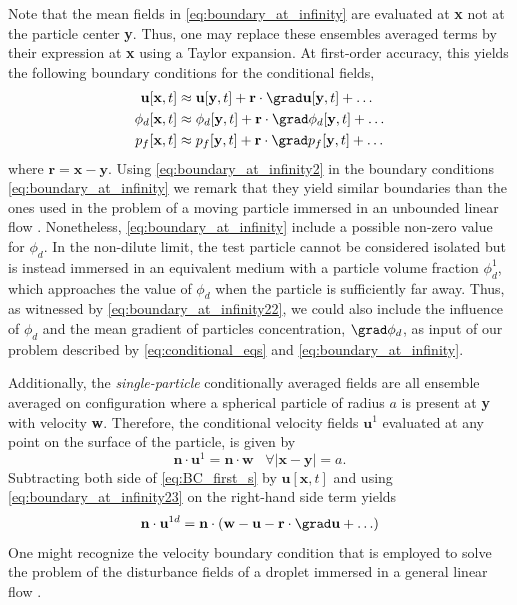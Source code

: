 Note that the mean fields in \ref{eq:boundary_at_infinity} are evaluated at \textbf{x} not at the particle center \textbf{y}.
Thus, one may replace these ensembles averaged terms by their expression at \textbf{x} using a Taylor expansion. 
At first-order accuracy, this yields the following boundary conditions for the conditional fields, 
\begin{align}
    \textbf{u}[\textbf{x},t] 
    &\approx \textbf{u}[\textbf{y},t] 
    + \textbf{r}\cdot \grad\textbf{u}[\textbf{y},t] 
    \label{eq:boundary_at_infinity23}
    + \ldots\\
    \phi_d[\textbf{x},t] 
    &\approx \phi_d[\textbf{y},t] 
    \label{eq:boundary_at_infinity22}
    + \textbf{r}\cdot \grad \phi_d[\textbf{y},t]  
    + \ldots\\
    p_f[\textbf{x},t] 
    &\approx p_f[\textbf{y},t] 
    + \textbf{r}\cdot  \grad p_f[\textbf{y},t] 
    + \ldots
    \label{eq:boundary_at_infinity2}
\end{align}
where $\textbf{r} = \textbf{x} - \textbf{y}$. 
Using \ref{eq:boundary_at_infinity2} in the boundary conditions \eqref{eq:boundary_at_infinity} we remark that they yield similar boundaries than the ones used in the problem of a moving particle immersed in an unbounded linear flow \citep{jackson1997locally,zhang1997momentum}. 
Nonetheless,  \ref{eq:boundary_at_infinity} include a possible non-zero value for $\phi_d$. 
In the non-dilute limit, the test particle cannot be considered isolated but is instead immersed in an equivalent medium with a particle volume fraction $\phi_d^1$, which approaches the value of $\phi_d$ when the particle is sufficiently far away. 
Thus, as witnessed by \ref{eq:boundary_at_infinity22}, we could also include the influence of $\phi_d$ and the mean gradient of particles concentration, $\grad \phi_d$, as input of our problem described by \eqref{eq:conditional_eqs} and \ref{eq:boundary_at_infinity}.


Additionally, the \textit{single-particle} conditionally averaged fields are all ensemble averaged on configuration where a spherical particle of radius $a$ is present at \textbf{y} with velocity \textbf{w}.
Therefore, the conditional velocity fields $\textbf{u}^1$ evaluated at any point on the surface of the particle, is given by 
\begin{equation}
    \textbf{n}\cdot \textbf{u}^1= \textbf{n} \cdot \textbf{w} \;\;\;\forall |\textbf{x} - \textbf{y}| = a. 
    \label{eq:BC_first_s}
\end{equation}
Subtracting both side of \ref{eq:BC_first_s} by $\textbf{u}[\textbf{x},t]$ and using \ref{eq:boundary_at_infinity23} on the right-hand side term yields
\begin{equation}
    \textbf{n}\cdot\textbf{u}^{1d}
    = \textbf{n}\cdot(
    \textbf{w} 
    - \textbf{u}
    -\textbf{r} \cdot \grad\textbf{u} 
    + \ldots
    )
    \label{eq:BC_1}
\end{equation}
One might recognize the velocity boundary condition that is employed to solve the problem of the disturbance fields of a droplet immersed in a general linear flow \citet{pozrikidis1992boundary}. 

